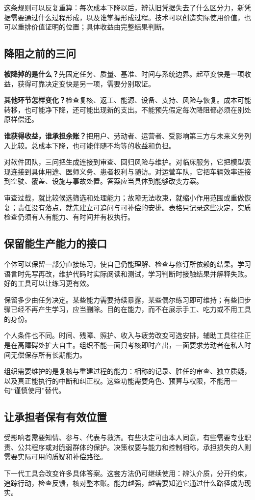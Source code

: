 这条规则可以反复重算：每次成本下降以后，辨认旧凭据失去了什么区分力，新凭据需要通过什么过程形成，以及谁掌握形成过程。技术可以创造实际使用价值，也可以重排价值证明的位置；具体收益由完整结果判断。

\subsection{降阻之前的三问}

\textbf{被降掉的是什么？}先固定任务、质量、基准、时间与系统边界。起草变快是一项收益，获得可靠决定变快是另一项，需要分别取证。

\textbf{其他环节怎样变化？}检查复核、返工、能源、设备、支持、风险与恢复。成本可能转移，也可能净下降，还可能出现新的支出。不能预先假定每次降阻都必须在别处原样偿还。

\textbf{谁获得收益，谁承担余账？}把用户、劳动者、运营者、受影响第三方与未来义务列入比较。总成本下降，也可能伴随不均等的收益和负担。

对软件团队，三问把生成连接到审查、回归风险与维护。对临床服务，它把模型表现连接到具体用途、医师义务、患者权利与随访。对运营车队，它把车辆效率连接到空驶、覆盖、设施与事故处置。答案应当具体到能够改变方案。

审查过载，就比较候选筛选和处理能力；故障无法收束，就缩小作用范围或重做恢复；责任没有落点，就先建立可追问与可补偿的安排。表格只记录这些决定，实质检查仍须有人有能力、有时间并有权执行。

\subsection{保留能生产能力的接口}

个体可以保留一部分直接练习，使自己仍能理解、检查与修订所依赖的结果。学习语言时先写再改，维护代码时实际阅读和测试，学习判断时接触结果并解释失败。好的工具可以让练习更有效。

保留多少由任务决定。某些能力需要持续暴露，某些偶尔练习即可维持；有些旧步骤已经不再产生学习，应当删除。目的在能力，而不在展示手工、吃力或不用工具的身份。

个人条件也不同。时间、残障、照护、收入与疲劳改变可选安排，辅助工具往往正是在高障碍处扩大自主。组织不能一面只考核即时产出，一面要求劳动者在私人时间无偿保存所有长期能力。

组织需要维护的是复核与重建过程的能力：相称的记录、胜任的审查、独立质疑，以及真正能执行的中断和纠正权。这些功能需要角色、预算与权限，不能用一句“谨慎使用”替代。

\subsection{让承担者保有有效位置}

受影响者需要知情、参与、代表与救济。有些决定可由本人同意，有些需要专业职责、公共程序或对脆弱群体的保护。决策权要与能力和控制相称，承担损失的人则需要实际可用的质疑和补偿路径。

下一代工具会改变许多具体答案。这套方法仍可继续使用：辨认介质，分开约束，追踪行动，检查反馈，核对整本账。能力越强，越需要知道它通过什么路径成为现实。
